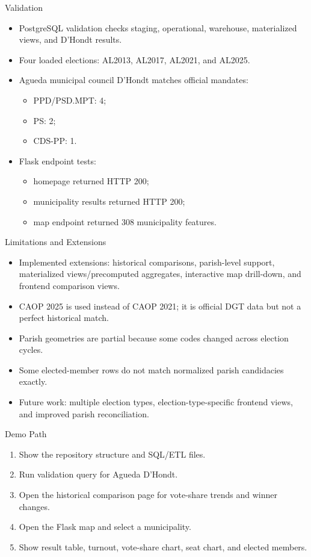 \documentclass[aspectratio=169]{beamer}
\begin{document}
\begin{frame}{Validation}
  \begin{itemize}
    \item PostgreSQL validation checks staging, operational, warehouse, materialized views, and D'Hondt results.
    \item Four loaded elections: AL2013, AL2017, AL2021, and AL2025.
    \item Agueda municipal council D'Hondt matches official mandates:
      \begin{itemize}
        \item PPD/PSD.MPT: 4;
        \item PS: 2;
        \item CDS-PP: 1.
      \end{itemize}
    \item Flask endpoint tests:
      \begin{itemize}
        \item homepage returned HTTP 200;
        \item municipality results returned HTTP 200;
        \item map endpoint returned 308 municipality features.
      \end{itemize}
  \end{itemize}
\end{frame}

\begin{frame}{Limitations and Extensions}
  \begin{itemize}
    \item Implemented extensions: historical comparisons, parish-level support, materialized views/precomputed aggregates, interactive map drill-down, and frontend comparison views.
    \item CAOP 2025 is used instead of CAOP 2021; it is official DGT data but not a perfect historical match.
    \item Parish geometries are partial because some codes changed across election cycles.
    \item Some elected-member rows do not match normalized parish candidacies exactly.
    \item Future work: multiple election types, election-type-specific frontend views, and improved parish reconciliation.
  \end{itemize}
\end{frame}

\begin{frame}{Demo Path}
  \begin{enumerate}
    \item Show the repository structure and SQL/ETL files.
    \item Run validation query for Agueda D'Hondt.
    \item Open the historical comparison page for vote-share trends and winner changes.
    \item Open the Flask map and select a municipality.
    \item Show result table, turnout, vote-share chart, seat chart, and elected members.
  \end{enumerate}
\end{frame}
\end{document}

